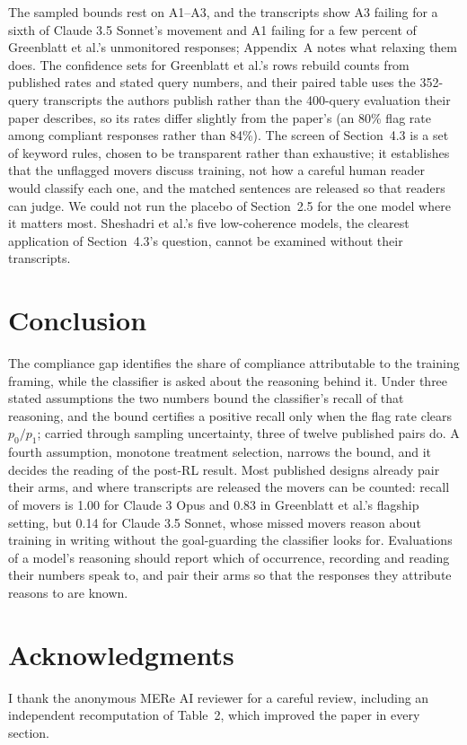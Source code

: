 \documentclass[11pt]{article}
\begin{document}
The sampled bounds rest on A1--A3, and the transcripts show A3 failing for a sixth of Claude 3.5 Sonnet's movement and A1 failing for a few percent of Greenblatt et al.'s unmonitored responses; Appendix~A notes what relaxing them does. The confidence sets for Greenblatt et al.'s rows rebuild counts from published rates and stated query numbers, and their paired table uses the 352-query transcripts the authors publish rather than the 400-query evaluation their paper describes, so its rates differ slightly from the paper's (an 80\% flag rate among compliant responses rather than 84\%). The screen of Section~4.3 is a set of keyword rules, chosen to be transparent rather than exhaustive; it establishes that the unflagged movers discuss training, not how a careful human reader would classify each one, and the matched sentences are released so that readers can judge. We could not run the placebo of Section~2.5 for the one model where it matters most. Sheshadri et al.'s five low-coherence models, the clearest application of Section~4.3's question, cannot be examined without their transcripts.

\section{Conclusion}

The compliance gap identifies the share of compliance attributable to the training framing, while the classifier is asked about the reasoning behind it. Under three stated assumptions the two numbers bound the classifier's recall of that reasoning, and the bound certifies a positive recall only when the flag rate clears $p_0/p_1$; carried through sampling uncertainty, three of twelve published pairs do. A fourth assumption, monotone treatment selection, narrows the bound, and it decides the reading of the post-RL result. Most published designs already pair their arms, and where transcripts are released the movers can be counted: recall of movers is 1.00 for Claude 3 Opus and 0.83 in Greenblatt et al.'s flagship setting, but 0.14 for Claude 3.5 Sonnet, whose missed movers reason about training in writing without the goal-guarding the classifier looks for. Evaluations of a model's reasoning should report which of occurrence, recording and reading their numbers speak to, and pair their arms so that the responses they attribute reasons to are known.

\section*{Acknowledgments}
I thank the anonymous MERe AI reviewer for a careful review, including an independent recomputation of Table~2, which improved the paper in every section.
\end{document}
